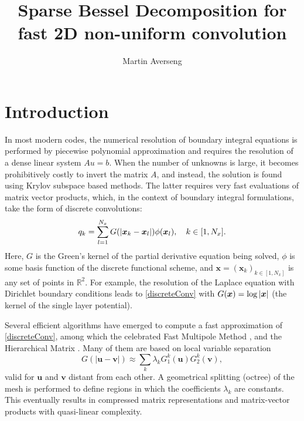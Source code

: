 \documentclass[11pt,a4paper]{article}
\author{Martin Averseng}
\title{Sparse Bessel Decomposition for fast 2D non-uniform convolution}
\begin{document}
\maketitle
	
	

\section{Introduction}
In most modern codes, the numerical resolution of boundary integral equations is performed by piecewise polynomial approximation and requires the resolution of a dense linear system $Au = b$. When the number of unknowns is large, it becomes prohibitively costly to invert the matrix $A$, and instead, the solution is found using Krylov subspace based methods. The latter requires very fast evaluations of matrix vector products, which, in the context of boundary integral formulations, take the form of discrete convolutions:
\begin{equation}
	q_k = \sum_{l=1}^{N_x} G(\left\lvert \boldsymbol{x}_k - \boldsymbol{x}_l \right\rvert) \phi(\boldsymbol{x}_l), \quad k \in [1,N_x].
	\label{discreteConv}					
\end{equation}
Here, $G$ is the Green's kernel of the partial derivative equation being solved, $\phi$ is some basis function of the discrete functional scheme, and $\boldsymbol{x} = (\boldsymbol{x}_k)_{k\in[1,N_x]}$  is any set of points in $\mathbb{R}^2$. For example, the resolution of the Laplace equation with Dirichlet boundary conditions leads to \eqref{discreteConv} with $G(\boldsymbol{x}) = \log\left\lvert \boldsymbol{x} \right\rvert$ (the kernel of the single layer potential).

Several efficient algorithms have emerged to compute a fast approximation of \eqref{discreteConv}, among which the celebrated Fast Multipole Method \cite{} , and the Hierarchical Matrix . Many of them are based on local variable separation
\[G(|\boldsymbol{u} - \boldsymbol{v}|) \approx \sum_k \lambda_k G^k_1(\boldsymbol{u})G^k_2(\boldsymbol{v}),\] 
valid for $\boldsymbol{u}$ and $\boldsymbol{v}$ distant from each other. A geometrical splitting (octree) of the mesh is performed to define regions in which the coefficients $\lambda_k$ are constants. This eventually results in compressed matrix representations and matrix-vector products with quasi-linear complexity. 
\end{document}
